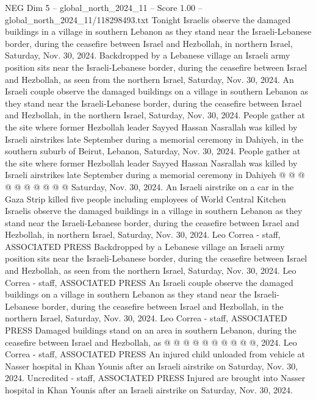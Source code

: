 \begin{textsample}{NEG Dim 5 – global\_north\_2024\_11 – Score 1.00 – global\_north\_2024\_11/118298493.txt}  \label{ex:f5_neg_419}
Tonight Israelis observe the damaged buildings in a village in southern Lebanon as they stand near the Israeli-Lebanese border, during the ceasefire between Israel and Hezbollah, in northern Israel, Saturday, Nov. 30, 2024.
Backdropped by a Lebanese village an Israeli army position sits near the Israeli-Lebanese border, during the ceasefire between Israel and Hezbollah, as seen from the northern Israel, Saturday, Nov. 30, 2024.
An Israeli couple observe the damaged buildings on a village in southern Lebanon as they stand near the Israeli-Lebanese border, during the ceasefire between Israel and Hezbollah, in the northern Israel, Saturday, Nov. 30, 2024.
People gather at the site where former Hezbollah leader Sayyed Hassan Nasrallah was killed by Israeli airstrikes late September during a memorial ceremony in Dahiyeh, in the southern suburb of Beirut, Lebanon, Saturday, Nov. 30, 2024.
People gather at the site where former Hezbollah leader Sayyed Hassan Nasrallah was killed by Israeli airstrikes late September during a memorial ceremony in Dahiyeh @ @ @ @ @ @ @ @ @ @ Saturday, Nov. 30, 2024.
An Israeli airstrike on a car in the Gaza Strip killed five people including employees of World Central Kitchen Israelis observe the damaged buildings in a village in southern Lebanon as they stand near the Israeli-Lebanese border, during the ceasefire between Israel and Hezbollah, in northern Israel, Saturday, Nov. 30, 2024.
Leo Correa - staff, ASSOCIATED PRESS Backdropped by a Lebanese village an Israeli army position sits near the Israeli-Lebanese border, during the ceasefire between Israel and Hezbollah, as seen from the northern Israel, Saturday, Nov. 30, 2024.
Leo Correa - staff, ASSOCIATED PRESS An Israeli couple observe the damaged buildings on a village in southern Lebanon as they stand near the Israeli-Lebanese border, during the ceasefire between Israel and Hezbollah, in the northern Israel, Saturday, Nov. 30, 2024.
Leo Correa - staff, ASSOCIATED PRESS Damaged buildings stand on an area in southern Lebanon, during the ceasefire between Israel and Hezbollah, as @ @ @ @ @ @ @ @ @ @, 2024.
Leo Correa - staff, ASSOCIATED PRESS An injured child unloaded from vehicle at Nasser hospital in Khan Younis after an Israeli airstrike on Saturday, Nov. 30, 2024.
Uncredited - staff, ASSOCIATED PRESS Injured are brought into Nasser hospital in Khan Younis after an Israeli airstrike on Saturday, Nov. 30, 2024.

\end{textsample}
